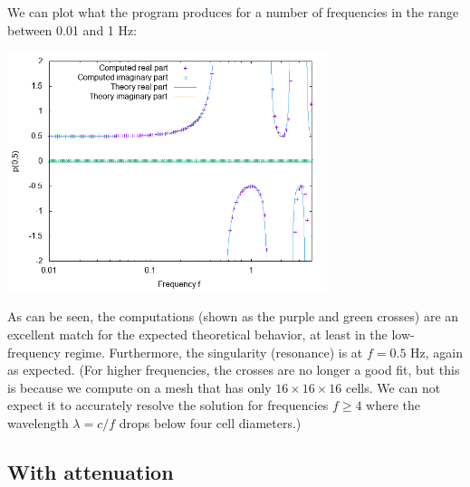 \documentclass{article}
\begin{document}
We can plot what the program produces for a number of frequencies in
the range between 0.01 and 1 Hz:
%
%

\begin{center}
\includegraphics[width=0.7\textwidth]{unit-cube/no-attenuation/pressure-at-center.png}
\end{center}

As can be seen, the computations (shown as the purple and green crosses)
are an excellent match for the expected theoretical behavior, at least
in the low-frequency regime. Furthermore, the singularity (resonance)
is at $f=0.5$ Hz, again as expected. (For higher frequencies, the
crosses are no longer a good fit, but this is because we compute on a
mesh that has only $16\times 16\times 16$ cells. We can not expect it to
accurately resolve the solution for frequencies $f\ge 4$ where the
wavelength $\lambda=c/f$ drops below four cell diameters.)


\subsection{With attenuation}
\end{document}
